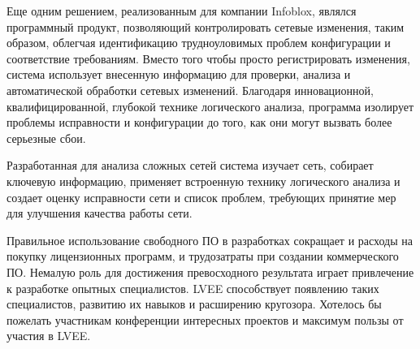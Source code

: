 \documentclass[10pt, a5paper]{article}
\begin{document}
Еще одним решением, реализованным для компании Infoblox, являлся программный продукт, позволяющий контролировать сетевые изменения, таким образом, облегчая идентификацию трудноуловимых проблем конфигурации и соответствие требованиям. Вместо того чтобы просто регистрировать изменения, система использует внесенную информацию для проверки, анализа и автоматической обработки сетевых изменений. Благодаря инновационной, квалифицированной, глубокой технике логического анализа, программа изолирует проблемы исправности и конфигурации до того, как они могут вызвать более серьезные сбои.


Разработанная для анализа сложных сетей система изучает сеть, собирает ключевую информацию, применяет встроенную технику логического анализа и создает оценку исправности сети и список проблем, требующих принятие мер для улучшения качества работы сети.


Правильное использование свободного ПО в разработках сокращает и расходы на покупку лицензионных программ, и трудозатраты при создании коммерческого ПО. Немалую роль для достижения превосходного результата играет привлечение к разработке опытных специалистов. LVEE способствует появлению таких специалистов, развитию их навыков и расширению кругозора. Хотелось бы пожелать участникам конференции интересных проектов и максимум пользы от участия в LVEE.
\end{document}
